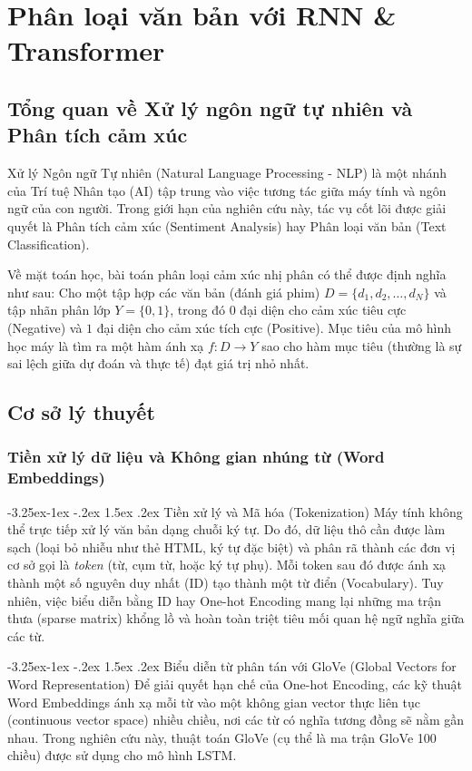 \documentclass[a4paper]{article}
\makeatletter
\theoremstyle{definition}
\newcounter {subsubsubsection}[subsubsection]
\newcommand\subsubsubsection{\@startsection{subsubsubsection}{4}{\z@}%
                                     {-3.25ex\@plus -1ex \@minus -.2ex}%
                                     {1.5ex \@plus .2ex}%
                                     {\normalfont\normalsize\bfseries}}
\makeatother
\begin{document}
\section{Phân loại văn bản với RNN \& Transformer}
\subsection{Tổng quan về Xử lý ngôn ngữ tự nhiên và Phân tích cảm xúc}
Xử lý Ngôn ngữ Tự nhiên (Natural Language Processing - NLP) là một nhánh của Trí tuệ Nhân tạo (AI) tập trung vào việc tương tác giữa máy tính và ngôn ngữ của con người. Trong giới hạn của nghiên cứu này, tác vụ cốt lõi được giải quyết là Phân tích cảm xúc (Sentiment Analysis) hay Phân loại văn bản (Text Classification).

Về mặt toán học, bài toán phân loại cảm xúc nhị phân có thể được định nghĩa như sau: Cho một tập hợp các văn bản (đánh giá phim) $D = \{d_1, d_2, \dots, d_N\}$ và tập nhãn phân lớp $Y = \{0, 1\}$, trong đó $0$ đại diện cho cảm xúc tiêu cực (Negative) và $1$ đại diện cho cảm xúc tích cực (Positive). Mục tiêu của mô hình học máy là tìm ra một hàm ánh xạ $f: D \rightarrow Y$ sao cho hàm mục tiêu (thường là sự sai lệch giữa dự đoán và thực tế) đạt giá trị nhỏ nhất.

\subsection{Cơ sở lý thuyết}

\subsubsection{Tiền xử lý dữ liệu và Không gian nhúng từ (Word Embeddings)}

\subsubsubsection{Tiền xử lý và Mã hóa (Tokenization)}
Máy tính không thể trực tiếp xử lý văn bản dạng chuỗi ký tự. Do đó, dữ liệu thô cần được làm sạch (loại bỏ nhiễu như thẻ HTML, ký tự đặc biệt) và phân rã thành các đơn vị cơ sở gọi là \textit{token} (từ, cụm từ, hoặc ký tự phụ). Mỗi token sau đó được ánh xạ thành một số nguyên duy nhất (ID) tạo thành một từ điển (Vocabulary). Tuy nhiên, việc biểu diễn bằng ID hay One-hot Encoding mang lại những ma trận thưa (sparse matrix) khổng lồ và hoàn toàn triệt tiêu mối quan hệ ngữ nghĩa giữa các từ.

\subsubsubsection{Biểu diễn từ phân tán với GloVe (Global Vectors for Word Representation)}
Để giải quyết hạn chế của One-hot Encoding, các kỹ thuật Word Embeddings ánh xạ mỗi từ vào một không gian vector thực liên tục (continuous vector space) nhiều chiều, nơi các từ có nghĩa tương đồng sẽ nằm gần nhau. Trong nghiên cứu này, thuật toán GloVe (cụ thể là ma trận GloVe 100 chiều) được sử dụng cho mô hình LSTM.
\end{document}
